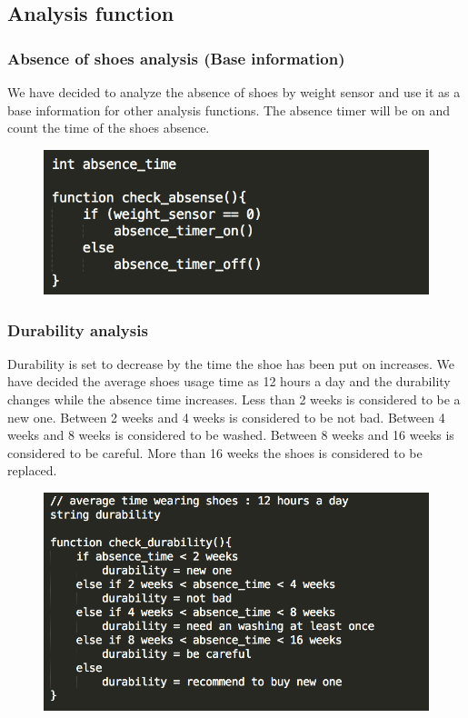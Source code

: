 \documentclass[conference]{IEEEtran}
\begin{document}
\subsection{Analysis function}
\subsubsection{Absence of shoes analysis (Base information)}
We have decided to analyze the absence of shoes by weight sensor and use it as a base information for other analysis functions. The absence timer will be on and count the time of the shoes absence.
\begin{figure}[H]
\begin{center}
    \includegraphics[scale=0.6]{analysis1}
    \label{fig:label}
\end{center}
\end{figure}
\subsubsection{Durability analysis}
Durability is set to decrease by the time the shoe has been put on increases. We have decided the average shoes usage time as 12 hours a day and the durability changes while the absence time increases. Less than 2 weeks is considered to be a new one. Between 2 weeks and 4 weeks is considered to be not bad. 
Between 4 weeks and 8 weeks is considered to be washed. Between 8 weeks and 16 weeks is considered to be careful. More than 16 weeks the shoes is considered to be replaced.
\begin{figure}[H]
\begin{center}
    \includegraphics[scale=0.58]{analysis2}
    \label{fig:label}
\end{center}
\end{figure}
\end{document}
